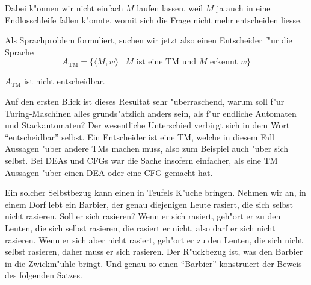 Dabei k"onnen wir nicht einfach $M$ laufen lassen, weil $M$
ja auch in eine Endlosschleife fallen k"onnte, womit sich die
Frage nicht mehr entscheiden liesse.

Als Sprachproblem formuliert, suchen wir jetzt also einen
Entscheider f"ur die Sprache
\[
A_{\text{TM}}=\{
\langle M,w\rangle\;|\; \text{$M$ ist eine TM und $M$ erkennt $w$}
\}
\]

\begin{satz}
$A_{\text{TM}}$ ist nicht entscheidbar.
\end{satz}

Auf den ersten Blick ist dieses Resultat sehr "uberraschend, warum
soll f"ur Turing-Maschinen alles grunds"atzlich anders sein, als
f"ur endliche Automaten und Stackautomaten? Der wesentliche Unterschied
verbirgt sich in dem Wort ``entscheidbar'' selbst. Ein Entscheider ist eine
TM, welche in diesem Fall Aussagen "uber andere TMs machen muss, also
zum Beispiel auch "uber sich selbst. Bei DEAs und CFGs war die Sache
insofern einfacher, als eine TM Aussagen "uber einen DEA oder eine
CFG gemacht hat.

Ein solcher Selbstbezug kann einen in Teufels K"uche bringen. 
Nehmen wir an, in einem Dorf lebt ein Barbier, der genau diejenigen
Leute rasiert, die sich selbst nicht rasieren. Soll er sich rasieren?
Wenn er sich rasiert, geh"ort er zu den Leuten, die sich selbst rasieren,
die rasiert er nicht, also darf er sich nicht rasieren. Wenn er sich
aber nicht rasiert, geh"ort er zu den Leuten, die sich nicht selbst
rasieren, daher muss er sich rasieren. Der R"uckbezug ist, was den
Barbier in die Zwickm"uhle bringt. Und genau so einen ``Barbier''
konstruiert der Beweis des folgenden Satzes.

